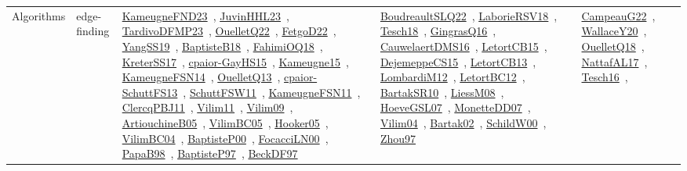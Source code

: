 {\begin{longtable}{lp{3cm}>{\raggedright\arraybackslash}p{6cm}>{\raggedright\arraybackslash}p{6cm}>{\raggedright\arraybackslash}p{8cm}}
Algorithms & edge-finding & \href{papers/KameugneFND23.pdf}{KameugneFND23}~\cite{KameugneFND23}, \href{papers/JuvinHHL23.pdf}{JuvinHHL23}~\cite{JuvinHHL23}, \href{papers/TardivoDFMP23.pdf}{TardivoDFMP23}~\cite{TardivoDFMP23}, \href{papers/OuelletQ22.pdf}{OuelletQ22}~\cite{OuelletQ22}, \href{articles/FetgoD22.pdf}{FetgoD22}~\cite{FetgoD22}, \href{papers/YangSS19.pdf}{YangSS19}~\cite{YangSS19}, \href{articles/BaptisteB18.pdf}{BaptisteB18}~\cite{BaptisteB18}, \href{articles/FahimiOQ18.pdf}{FahimiOQ18}~\cite{FahimiOQ18}, \href{articles/KreterSS17.pdf}{KreterSS17}~\cite{KreterSS17}, \href{papers/cpaior-GayHS15.pdf}{cpaior-GayHS15}~\cite{cpaior-GayHS15}, \href{articles/Kameugne15.pdf}{Kameugne15}~\cite{Kameugne15}, \href{articles/KameugneFSN14.pdf}{KameugneFSN14}~\cite{KameugneFSN14}, \href{papers/OuelletQ13.pdf}{OuelletQ13}~\cite{OuelletQ13}, \href{papers/cpaior-SchuttFS13.pdf}{cpaior-SchuttFS13}~\cite{cpaior-SchuttFS13}, \href{articles/SchuttFSW11.pdf}{SchuttFSW11}~\cite{SchuttFSW11}, \href{papers/KameugneFSN11.pdf}{KameugneFSN11}~\cite{KameugneFSN11}, \href{papers/ClercqPBJ11.pdf}{ClercqPBJ11}~\cite{ClercqPBJ11}, \href{papers/Vilim11.pdf}{Vilim11}~\cite{Vilim11}, \href{papers/Vilim09.pdf}{Vilim09}~\cite{Vilim09}, \href{papers/ArtiouchineB05.pdf}{ArtiouchineB05}~\cite{ArtiouchineB05}, \href{articles/VilimBC05.pdf}{VilimBC05}~\cite{VilimBC05}, \href{articles/Hooker05.pdf}{Hooker05}~\cite{Hooker05}, \href{papers/VilimBC04.pdf}{VilimBC04}~\cite{VilimBC04}, \href{articles/BaptisteP00.pdf}{BaptisteP00}~\cite{BaptisteP00}, \href{papers/FocacciLN00.pdf}{FocacciLN00}~\cite{FocacciLN00}, \href{articles/PapaB98.pdf}{PapaB98}~\cite{PapaB98}, \href{papers/BaptisteP97.pdf}{BaptisteP97}~\cite{BaptisteP97}, \href{papers/BeckDF97.pdf}{BeckDF97}~\cite{BeckDF97} & \href{papers/BoudreaultSLQ22.pdf}{BoudreaultSLQ22}~\cite{BoudreaultSLQ22}, \href{articles/LaborieRSV18.pdf}{LaborieRSV18}~\cite{LaborieRSV18}, \href{papers/Tesch18.pdf}{Tesch18}~\cite{Tesch18}, \href{papers/GingrasQ16.pdf}{GingrasQ16}~\cite{GingrasQ16}, \href{papers/CauwelaertDMS16.pdf}{CauwelaertDMS16}~\cite{CauwelaertDMS16}, \href{articles/LetortCB15.pdf}{LetortCB15}~\cite{LetortCB15}, \href{papers/DejemeppeCS15.pdf}{DejemeppeCS15}~\cite{DejemeppeCS15}, \href{papers/LetortCB13.pdf}{LetortCB13}~\cite{LetortCB13}, \href{articles/LombardiM12.pdf}{LombardiM12}~\cite{LombardiM12}, \href{papers/LetortBC12.pdf}{LetortBC12}~\cite{LetortBC12}, \href{articles/BartakSR10.pdf}{BartakSR10}~\cite{BartakSR10}, \href{articles/LiessM08.pdf}{LiessM08}~\cite{LiessM08}, \href{papers/HoeveGSL07.pdf}{HoeveGSL07}~\cite{HoeveGSL07}, \href{papers/MonetteDD07.pdf}{MonetteDD07}~\cite{MonetteDD07}, \href{papers/Vilim04.pdf}{Vilim04}~\cite{Vilim04}, \href{papers/Bartak02.pdf}{Bartak02}~\cite{Bartak02}, \href{articles/SchildW00.pdf}{SchildW00}~\cite{SchildW00}, \href{articles/Zhou97.pdf}{Zhou97}~\cite{Zhou97} & \href{articles/CampeauG22.pdf}{CampeauG22}~\cite{CampeauG22}, \href{articles/WallaceY20.pdf}{WallaceY20}~\cite{WallaceY20}, \href{papers/OuelletQ18.pdf}{OuelletQ18}~\cite{OuelletQ18}, \href{articles/NattafAL17.pdf}{NattafAL17}~\cite{NattafAL17}, \href{papers/Tesch16.pdf}{Tesch16}~\cite{Tesch16}, 
\end{longtable}}
